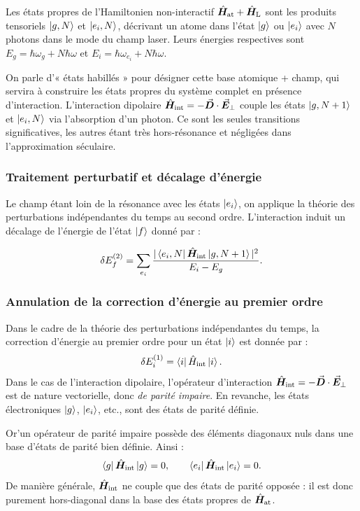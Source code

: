 Les états propres de l’Hamiltonien non-interactif \( \hat{\bm{H}}_{\mathrm{at}} + \hat{\bm{H}}_{\mathrm{L}} \) sont les produits tensoriels \( \ket{g, N} \) et \( \ket{e_i, N} \), décrivant un atome dans l’état \( \ket{g} \) ou \( \ket{e_i} \) avec \( N \) photons dans le mode du champ laser. Leurs énergies respectives sont \( E_g = \hbar \omega_{g} + N \hbar \omega \) et \( E_i = \hbar \omega_{e_i}  + N \hbar \omega \).

On parle d’« états habillés » pour désigner cette base atomique + champ, qui servira à construire les états propres du système complet en présence d’interaction. L’interaction dipolaire \( \hat{\bm{H}}_{\text{int}} = - \vec{{\bm{D}}} \cdot \vec{{\bm{E}}}_\perp \) couple les états \( \ket{g, N+1} \) et \( \ket{e_i, N} \) via l’absorption d’un photon. Ce sont les seules transitions significatives, les autres étant très hors-résonance et négligées dans l’approximation séculaire.


\subsubsection{Traitement perturbatif et décalage d’énergie}

Le champ étant loin de la résonance avec les états \( \ket{e_i} \), on applique la théorie des perturbations indépendantes du temps au second ordre. L’interaction induit un décalage de l’énergie de l’état \( \ket{f} \) donné par :

\[
\delta E_f^{(2)} = \sum_{e_i} \frac{|\bra{e_i, N} \hat{\bm{H}}_{\mathrm{int}} \ket{g, N+1}|^2}{E_i - E_g }.
\]
\subsubsection{Annulation de la correction d’énergie au premier ordre}

Dans le cadre de la théorie des perturbations indépendantes du temps, la correction d’énergie au premier ordre pour un état \( \ket{i} \) est donnée par :
\[
\delta E_i^{(1)} = \bra{i} \hat{H}_{\mathrm{int}} \ket{i}.
\]
Dans le cas de l’interaction dipolaire, l’opérateur d’interaction \( \hat{\bm{H}}_{\text{int}} = - \vec{{\bm{D}}} \cdot \vec{{\bm{E}}}_\perp \) est de nature vectorielle, donc \emph{de parité impaire}. En revanche, les états électroniques \( \ket{g} \), \( \ket{e_i} \), etc., sont des états de parité définie.

Or’un opérateur de parité impaire possède des éléments diagonaux nuls dans une base d’états de parité bien définie. Ainsi :
\[
\bra{g} \hat{\bm{H}}_{\text{int}}  \ket{g} = 0, \qquad \bra{e_i} \hat{\bm{H}}_{\text{int}}  \ket{e_i} = 0.
\]
De manière générale, \( \hat{\bm{H}}_{\text{int}}  \) ne couple que des états de parité opposée : il est donc purement hors-diagonal dans la base des états propres de \( \hat{\bm{H}}_{\mathrm{at}} \).

